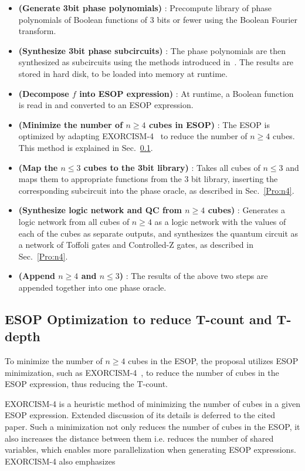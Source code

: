 \begin{itemize}
\item \textbf{(Generate 3bit phase polynomials)} : Precompute library of phase polynomials of Boolean functions of
  3 bits or fewer using the Boolean Fourier transform.
\item \textbf{(Synthesize 3bit phase subcircuits)} : The phase polynomials are then synthesized as subcircuits
  using the methods introduced in~. The results are stored in hard disk, to be loaded into
  memory at runtime.
\item \textbf{(Decompose $f$ into ESOP expression)} : At runtime, a Boolean function is read in and converted to
  an ESOP expression.
\item \textbf{(Minimize the number of $n \geq 4$ cubes in ESOP)} : The ESOP is optimized by adapting
  EXORCISM-4~\cite{bib-exorcism} to reduce the number of $n \geq 4$ cubes. This method is explained
  in Sec.~\ref{Pro:Minimize}.
\item \textbf{(Map the $n \leq 3$ cubes to the 3bit library)} : Takes all cubes of $n \leq 3$ and maps them to 
  appropriate functions from the 3 bit library, inserting the corresponding subcircuit into the phase oracle,
  as described in Sec.~\ref{Pro:n4}.
\item \textbf{(Synthesize logic network and QC from $n \geq 4$ cubes)} : Generates a logic network from all cubes
  of $n \geq 4$ as a logic network with the values of each of the cubes as separate outputs, and synthesizes the
  quantum circuit as a network of Toffoli gates and Controlled-Z gates, as described in Sec.~\ref{Pro:n4}.
\item \textbf{(Append $n \geq 4$ and $n \leq 3$)} : The results of the above two steps are appended together
  into one phase oracle.
\end{itemize}

\subsection{ESOP Optimization to reduce T-count and T-depth}
\label{Pro:Minimize}

To minimize the number of $n \geq 4$ cubes in the ESOP, the proposal utilizes ESOP
minimization, such as EXORCISM-4~\cite{bib-exorcism}, to reduce the number of cubes in the
ESOP expression, thus reducing the T-count.

EXORCISM-4 is a heuristic method of minimizing the number of cubes in a given ESOP
expression. Extended discussion of its details is deferred to the cited paper.
Such a minimization not only reduces the number of cubes in the ESOP, it also increases
the distance between them i.e. reduces the number of shared variables, which enables more
parallelization when generating ESOP expressions. EXORCISM-4 also emphasizes

